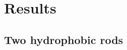 \documentclass[compress]{beamer}
\begin{document}
\section{Results}





\subsection{Two hydrophobic rods}
\end{document}

